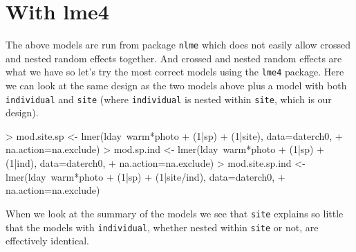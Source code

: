 \documentclass{article}
\begin{document}
\section{With lme4}

The above models are run from package \verb|nlme| which does not easily allow crossed and nested random effects together. And crossed and nested random effects are what we have so let's try the most correct models using the \verb|lme4| package. Here we can look at the same design as the two models above plus a model with both  \verb|individual| and  \verb|site| (where \verb|individual| is nested within  \verb|site|, which is our design). 
\begin{Schunk}
\begin{Sinput}
> mod.site.sp <- lmer(lday~warm*photo + (1|sp) + (1|site), data=daterch0, 
+     na.action=na.exclude)
> mod.sp.ind <- lmer(lday~warm*photo + (1|sp) + (1|ind), data=daterch0, 
+     na.action=na.exclude)
> mod.site.sp.ind <- lmer(lday~warm*photo + (1|sp) + (1|site/ind), data=daterch0, 
+     na.action=na.exclude)
\end{Sinput}
\end{Schunk}

When we look at the summary of the models we see that \verb|site| explains so little that the models with \verb|individual|, whether nested within \verb|site| or not, are effectively identical.
\end{document}
